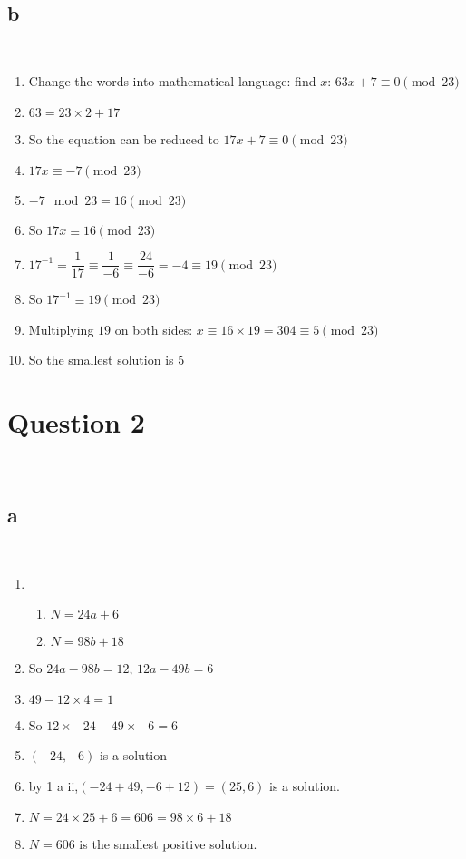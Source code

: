 \documentclass{article}
\begin{document}
~

\subsection*{b}


~

\begin{enumerate}
    \item Change the words into mathematical language: find $x$: $63x+7\equiv 0\pmod{23}$
    \item $63=23\times 2 +17$
    \item So the equation can be reduced to $17x+7\equiv 0\pmod{23}$
    \item $17x\equiv -7\pmod{23}$
    \item $-7\mod{23}=16\pmod{23}$
    \item So $17x\equiv 16\pmod{23}$
    \item $17^{-1}=\dfrac{1}{17}\equiv\dfrac{1}{-6}\equiv\dfrac{24}{-6}=-4\equiv 19\pmod{23}$
    \item So $17^{-1}\equiv 19\pmod{23}$
    \item Multiplying $19$ on both sides: $x\equiv 16\times 19=304\equiv5\pmod{23}$
    \item So the smallest solution is 5
\end{enumerate}

\newpage

\section*{Question 2}

~

\subsection*{a}

~

\begin{enumerate}
    \item \begin{enumerate}
        \item $N=24a+6$
        \item $N=98b+18$
    \end{enumerate}
    \item So $24a-98b=12$, $12a-49b=6$
    \item $49-12\times 4 =1$
    \item So $12\times -24 - 49\times -6=6$
    \item $(-24,-6)$ is a solution
    \item by 1 a ii,$(-24+49,-6+12)=(25,6)$ is a solution.
    \item $N=24\times 25+6=606=98\times 6+18$
    \item $N=606$ is the smallest positive solution.
\end{enumerate}
\end{document}
